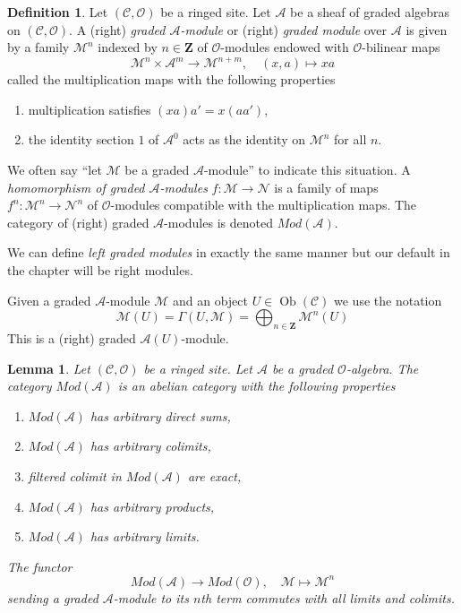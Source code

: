 \documentclass{stacks-project}
\theoremstyle{plain}
\newtheorem{lemma}[subsection]{Lemma}
\theoremstyle{definition}
\newtheorem{definition}[subsection]{Definition}
\theoremstyle{remark}
\numberwithin{equation}{subsection}
\def\Ob{\mathop{\mathrm{Ob}}\nolimits}
\begin{document}
\begin{definition}
\label{definition-gm}
Let $(\mathcal{C}, \mathcal{O})$ be a ringed site.
Let $\mathcal{A}$ be a sheaf of graded algebras
on $(\mathcal{C}, \mathcal{O})$.
A (right) {\it graded $\mathcal{A}$-module} or (right)
{\it graded module} over $\mathcal{A}$
is given by a family $\mathcal{M}^n$ indexed by $n \in \mathbf{Z}$
of $\mathcal{O}$-modules endowed with
$\mathcal{O}$-bilinear maps
$$
\mathcal{M}^n \times \mathcal{A}^m \to \mathcal{M}^{n + m},\quad
(x, a) \longmapsto xa
$$
called the multiplication maps with the following properties
\begin{enumerate}
\item multiplication satisfies $(xa)a' = x(aa')$,
\item the identity section $1$ of $\mathcal{A}^0$
acts as the identity on $\mathcal{M}^n$ for all $n$.
\end{enumerate}
We often say ``let $\mathcal{M}$ be a graded $\mathcal{A}$-module''
to indicate this situation.
A {\it homomorphism of graded $\mathcal{A}$-modules}
$f : \mathcal{M} \to \mathcal{N}$ is a family of maps
$f^n : \mathcal{M}^n \to \mathcal{N}^n$
of $\mathcal{O}$-modules compatible with the multiplication maps.
The category of (right) graded $\mathcal{A}$-modules
is denoted $\textit{Mod}(\mathcal{A})$.
\end{definition}

\noindent
We can define {\it left graded modules} in exactly the same manner
but our default in the chapter will be right modules.

\medskip\noindent
Given a graded $\mathcal{A}$-module $\mathcal{M}$
and an object $U \in \Ob(\mathcal{C})$ we use the notation
$$
\mathcal{M}(U) =
\Gamma(U, \mathcal{M}) =
\bigoplus\nolimits_{n \in \mathbf{Z}} \mathcal{M}^n(U)
$$
This is a (right) graded $\mathcal{A}(U)$-module.

\begin{lemma}
\label{lemma-gm-abelian}
Let $(\mathcal{C}, \mathcal{O})$ be a ringed site.
Let $\mathcal{A}$ be a graded $\mathcal{O}$-algebra.
The category $\textit{Mod}(\mathcal{A})$ is an abelian category
with the following properties
\begin{enumerate}
\item $\textit{Mod}(\mathcal{A})$ has arbitrary direct sums,
\item $\textit{Mod}(\mathcal{A})$ has arbitrary colimits,
\item filtered colimit in $\textit{Mod}(\mathcal{A})$ are exact,
\item $\textit{Mod}(\mathcal{A})$ has arbitrary products,
\item $\textit{Mod}(\mathcal{A})$ has arbitrary limits.
\end{enumerate}
The functor
$$
\textit{Mod}(\mathcal{A}) \longrightarrow \textit{Mod}(\mathcal{O}),\quad
\mathcal{M} \longmapsto \mathcal{M}^n
$$
sending a graded $\mathcal{A}$-module to its $n$th term commutes
with all limits and colimits.
\end{lemma}
\end{document}
